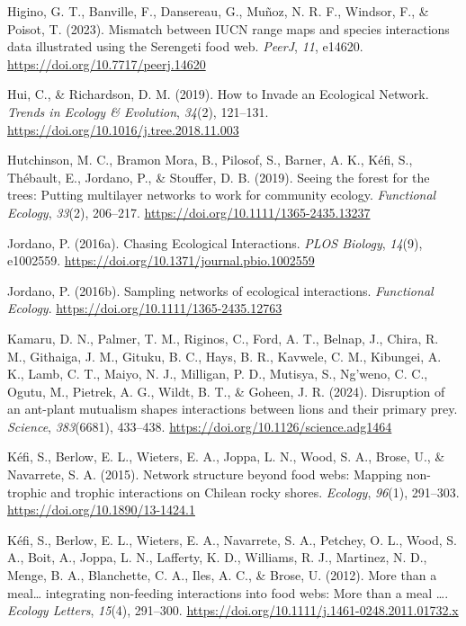 \documentclass[
]{article}
\newlength{\cslhangindent}
\newenvironment{CSLReferences}[2] %
 {\begin{list}{}{%
  \setlength{\itemindent}{0pt}
  \setlength{\leftmargin}{0pt}
  \setlength{\parsep}{0pt}
  \ifodd #1
   \setlength{\leftmargin}{\cslhangindent}
   \setlength{\itemindent}{-1\cslhangindent}
  \fi
  \setlength{\itemsep}{#2\baselineskip}}}
 {\end{list}}
\begin{document}
\begin{CSLReferences}{1}{0}
Higino, G. T., Banville, F., Dansereau, G., Muñoz, N. R. F., Windsor,
F., \& Poisot, T. (2023). Mismatch between {IUCN} range maps and species
interactions data illustrated using the {Serengeti} food web.
\emph{PeerJ}, \emph{11}, e14620.
\url{https://doi.org/10.7717/peerj.14620}

Hui, C., \& Richardson, D. M. (2019). How to {Invade} an {Ecological
Network}. \emph{Trends in Ecology \& Evolution}, \emph{34}(2), 121--131.
\url{https://doi.org/10.1016/j.tree.2018.11.003}

Hutchinson, M. C., Bramon Mora, B., Pilosof, S., Barner, A. K., Kéfi,
S., Thébault, E., Jordano, P., \& Stouffer, D. B. (2019). Seeing the
forest for the trees: {Putting} multilayer networks to work for
community ecology. \emph{Functional Ecology}, \emph{33}(2), 206--217.
\url{https://doi.org/10.1111/1365-2435.13237}

Jordano, P. (2016a). Chasing {Ecological Interactions}. \emph{PLOS
Biology}, \emph{14}(9), e1002559.
\url{https://doi.org/10.1371/journal.pbio.1002559}

Jordano, P. (2016b). Sampling networks of ecological interactions.
\emph{Functional Ecology}. \url{https://doi.org/10.1111/1365-2435.12763}

Kamaru, D. N., Palmer, T. M., Riginos, C., Ford, A. T., Belnap, J.,
Chira, R. M., Githaiga, J. M., Gituku, B. C., Hays, B. R., Kavwele, C.
M., Kibungei, A. K., Lamb, C. T., Maiyo, N. J., Milligan, P. D.,
Mutisya, S., Ng'weno, C. C., Ogutu, M., Pietrek, A. G., Wildt, B. T., \&
Goheen, J. R. (2024). Disruption of an ant-plant mutualism shapes
interactions between lions and their primary prey. \emph{Science},
\emph{383}(6681), 433--438.
\url{https://doi.org/10.1126/science.adg1464}

Kéfi, S., Berlow, E. L., Wieters, E. A., Joppa, L. N., Wood, S. A.,
Brose, U., \& Navarrete, S. A. (2015). Network structure beyond food
webs: Mapping non-trophic and trophic interactions on {Chilean} rocky
shores. \emph{Ecology}, \emph{96}(1), 291--303.
\url{https://doi.org/10.1890/13-1424.1}

Kéfi, S., Berlow, E. L., Wieters, E. A., Navarrete, S. A., Petchey, O.
L., Wood, S. A., Boit, A., Joppa, L. N., Lafferty, K. D., Williams, R.
J., Martinez, N. D., Menge, B. A., Blanchette, C. A., Iles, A. C., \&
Brose, U. (2012). More than a meal{\ldots{}} integrating non-feeding
interactions into food webs: {More} than a meal {\ldots{}}.
\emph{Ecology Letters}, \emph{15}(4), 291--300.
\url{https://doi.org/10.1111/j.1461-0248.2011.01732.x}


\end{CSLReferences}
\end{document}

